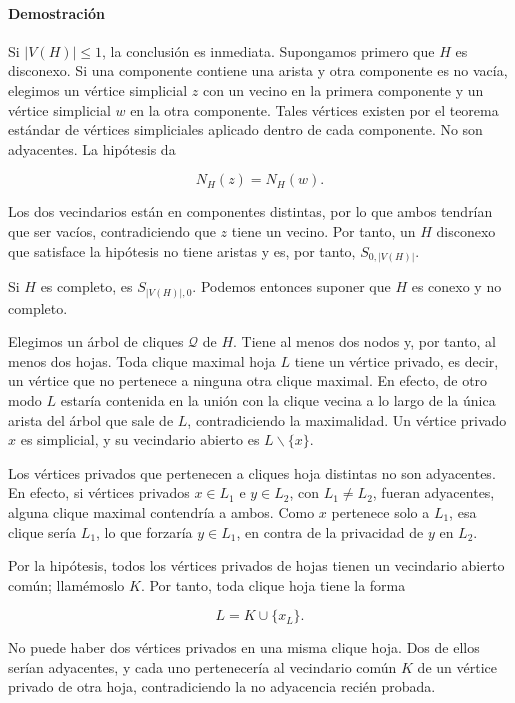 \documentclass[
  spanish,
  11pt,
  a4paper,
]{article}
\begin{document}
\paragraph{Demostración}\label{demostraciuxf3n-5}

Si \(|V(H)|\le1\), la conclusión es inmediata. Supongamos primero que \(H\) es disconexo. Si una componente contiene una arista y otra componente es no vacía, elegimos un vértice simplicial \(z\) con un vecino en la primera componente y un vértice simplicial \(w\) en la otra componente. Tales vértices existen por el teorema estándar de vértices simpliciales aplicado dentro de cada componente. No son adyacentes. La hipótesis da

\[
N_H(z)=N_H(w).
\]

Los dos vecindarios están en componentes distintas, por lo que ambos tendrían que ser vacíos, contradiciendo que \(z\) tiene un vecino. Por tanto, un \(H\) disconexo que satisface la hipótesis no tiene aristas y es, por tanto, \(S_{0,|V(H)|}\).

Si \(H\) es completo, es \(S_{|V(H)|,0}\). Podemos entonces suponer que \(H\) es conexo y no completo.

Elegimos un árbol de cliques \(\mathcal Q\) de \(H\). Tiene al menos dos nodos y, por tanto, al menos dos hojas. Toda clique maximal hoja \(L\) tiene un vértice privado, es decir, un vértice que no pertenece a ninguna otra clique maximal. En efecto, de otro modo \(L\) estaría contenida en la unión con la clique vecina a lo largo de la única arista del árbol que sale de \(L\), contradiciendo la maximalidad. Un vértice privado \(x\) es simplicial, y su vecindario abierto es \(L\backslash\{x\}\).

Los vértices privados que pertenecen a cliques hoja distintas no son adyacentes. En efecto, si vértices privados \(x\in L_1\) e \(y\in L_2\), con \(L_1\ne L_2\), fueran adyacentes, alguna clique maximal contendría a ambos. Como \(x\) pertenece solo a \(L_1\), esa clique sería \(L_1\), lo que forzaría \(y\in L_1\), en contra de la privacidad de \(y\) en \(L_2\).

Por la hipótesis, todos los vértices privados de hojas tienen un vecindario abierto común; llamémoslo \(K\). Por tanto, toda clique hoja tiene la forma

\[
L=K\cup\{x_L\}.
\]

No puede haber dos vértices privados en una misma clique hoja. Dos de ellos serían adyacentes, y cada uno pertenecería al vecindario común \(K\) de un vértice privado de otra hoja, contradiciendo la no adyacencia recién probada.
\end{document}
